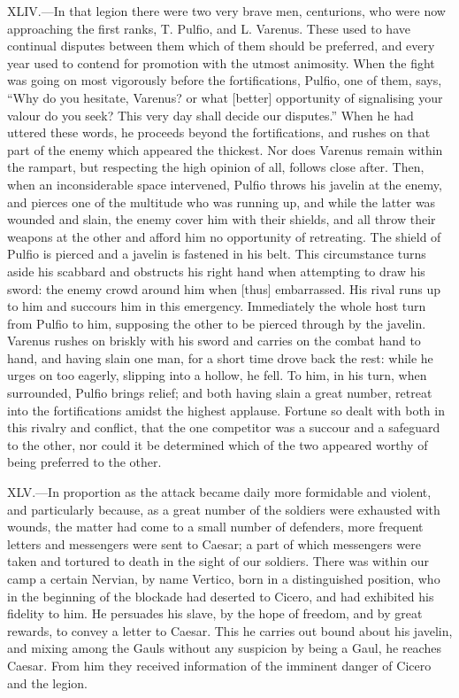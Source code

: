 XLIV.—In that legion there were two very brave men, centurions, who
were now approaching the first ranks, T. Pulfio, and L. Varenus. These
used to have continual disputes between them which of them should be
preferred, and every year used to contend for promotion with the utmost
animosity. When the fight was going on most vigorously before the
fortifications, Pulfio, one of them, says, ``Why do you hesitate,
Varenus? or what [better] opportunity of signalising your valour do you
seek? This very day shall decide our disputes.'' When he had uttered
these words, he proceeds beyond the fortifications, and rushes on that
part of the enemy which appeared the thickest. Nor does Varenus remain
within the rampart, but respecting the high opinion of all, follows
close after. Then, when an inconsiderable space intervened, Pulfio
throws his javelin at the enemy, and pierces one of the multitude who
was running up, and while the latter was wounded and slain, the enemy
cover him with their shields, and all throw their weapons at the other
and afford him no opportunity of retreating. The shield of Pulfio is
pierced and a javelin is fastened in his belt. This circumstance turns
aside his scabbard and obstructs his right hand when attempting to draw
his sword: the enemy crowd around him when [thus] embarrassed. His rival
runs up to him and succours him in this emergency. Immediately the whole
host turn from Pulfio to him, supposing the other to be pierced through
by the javelin. Varenus rushes on briskly with his sword and carries on
the combat hand to hand, and having slain one man, for a short time
drove back the rest: while he urges on too eagerly, slipping into a
hollow, he fell. To him, in his turn, when surrounded, Pulfio brings
relief; and both having slain a great number, retreat into the
fortifications amidst the highest applause. Fortune so dealt with both
in this rivalry and conflict, that the one competitor was a succour and
a safeguard to the other, nor could it be determined which of the two
appeared worthy of being preferred to the other.

XLV.—In proportion as the attack became daily more formidable and
violent, and particularly because, as a great number of the soldiers
were exhausted with wounds, the matter had come to a small number of
defenders, more frequent letters and messengers were sent to Caesar; a
part of which messengers were taken and tortured to death in the sight
of our soldiers. There was within our camp a certain Nervian, by name
Vertico, born in a distinguished position, who in the beginning of the
blockade had deserted to Cicero, and had exhibited his fidelity to him.
He persuades his slave, by the hope of freedom, and by great rewards, to
convey a letter to Caesar. This he carries out bound about his javelin,
and mixing among the Gauls without any suspicion by being a Gaul, he
reaches Caesar. From him they received information of the imminent
danger of Cicero and the legion.

